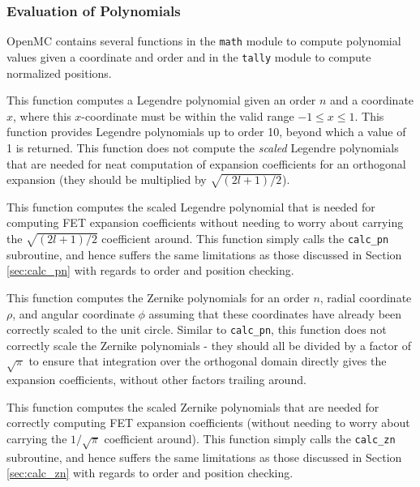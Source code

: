 \documentclass[10pt]{article}
\newcounter{subsubsubsection}[subsubsection]
\numberwithin{equation}{section} %
\begin{document}
\subsubsection{Evaluation of Polynomials}
OpenMC contains several functions in the {\tt math} module to compute polynomial values given a coordinate and order and in the {\tt tally} module to compute normalized positions. %

\label{sec:calc_pn}
This function computes a Legendre polynomial given an order \(n\) and a coordinate \(x\), where this \(x\)-coordinate must be within the valid range \(-1\leq x\leq1\). This function provides Legendre polynomials up to order 10, beyond which a value of 1 is returned. This function does not compute the {\it scaled} Legendre polynomials that are needed for neat computation of expansion coefficients for an orthogonal expansion (they should be multiplied by \(\sqrt{(2l+1)/2}\)). 

This function computes the scaled Legendre polynomial that is needed for computing FET expansion coefficients without needing to worry about carrying the \(\sqrt{(2l+1)/2}\) coefficient around. This function simply calls the {\tt calc\_pn} subroutine, and hence suffers the same limitations as those discussed in Section \ref{sec:calc_pn} with regards to order and position checking. 

\label{sec:calc_zn}
This function computes the Zernike polynomials for an order \(n\), radial coordinate \(\rho\), and angular coordinate \(\phi\) assuming that these coordinates have already been correctly scaled to the unit circle. Similar to {\tt calc\_pn}, this function does not correctly scale the Zernike polynomials - they should all be divided by a factor of \(\sqrt{\pi}\) to ensure that integration over the orthogonal domain directly gives the expansion coefficients, without other factors trailing around. 


This function computes the scaled Zernike polynomials that are needed for correctly computing FET expansion coefficients (without needing to worry about carrying the \(1/\sqrt{\pi}\) coefficient around). This function simply calls the {\tt calc\_zn} subroutine, and hence suffers the same limitations as those discussed in Section \ref{sec:calc_zn} with regards to order and position checking.
\end{document}
